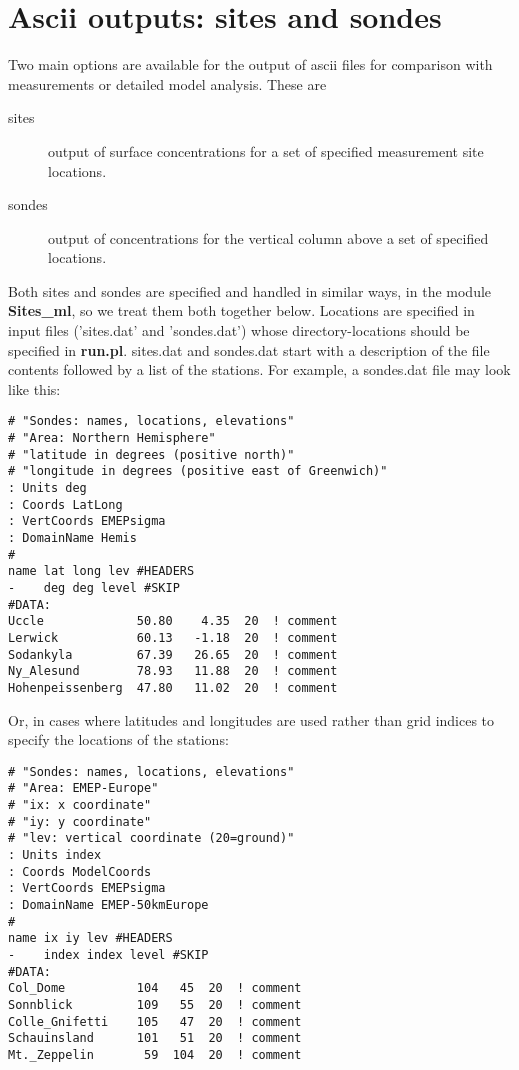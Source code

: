 \section{Ascii outputs: sites and sondes}\label{sec:sitesonde}


Two main options are available for the output of ascii files for comparison
with measurements or detailed model analysis. These are

\begin{description}
\item[sites]  

      output of surface concentrations for a set of specified
      measurement site locations.
\item[sondes] 

      output of concentrations for the vertical column above
     a set of specified locations.
\end{description}

Both sites and sondes are specified and handled in similar ways, in
the module {\bf Sites\_ml}, so we treat them both together below.
Locations are specified in input files ('sites.dat' and 'sondes.dat')
whose directory-locations should be specified in {\bf run.pl}.
sites.dat and sondes.dat start with a description of the file contents
followed by a list of the stations. For example, a sondes.dat file
may look like this:

\begin{small}
\begin{verbatim}
# "Sondes: names, locations, elevations"
# "Area: Northern Hemisphere"
# "latitude in degrees (positive north)"
# "longitude in degrees (positive east of Greenwich)"
: Units deg
: Coords LatLong
: VertCoords EMEPsigma
: DomainName Hemis
#
name lat long lev #HEADERS
-    deg deg level #SKIP
#DATA:
Uccle             50.80    4.35  20  ! comment
Lerwick           60.13   -1.18  20  ! comment
Sodankyla         67.39   26.65  20  ! comment
Ny_Alesund        78.93   11.88  20  ! comment
Hohenpeissenberg  47.80   11.02  20  ! comment
\end{verbatim}
\end{small}

Or, in cases where latitudes and longitudes are used rather than grid
indices to specify the locations of the stations:

\begin{small}
\begin{verbatim}
# "Sondes: names, locations, elevations"
# "Area: EMEP-Europe"
# "ix: x coordinate"
# "iy: y coordinate"
# "lev: vertical coordinate (20=ground)"
: Units index
: Coords ModelCoords
: VertCoords EMEPsigma
: DomainName EMEP-50kmEurope
#
name ix iy lev #HEADERS
-    index index level #SKIP
#DATA:
Col_Dome          104   45  20  ! comment
Sonnblick         109   55  20  ! comment
Colle_Gnifetti    105   47  20  ! comment
Schauinsland      101   51  20  ! comment
Mt._Zeppelin       59  104  20  ! comment
\end{verbatim}
\end{small}


